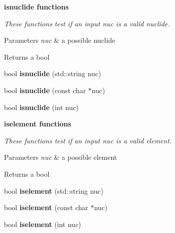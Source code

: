 \begin{Indent}{\bf isnuclide functions}\par
{\em These functions test if an input {\itshape nuc} is a valid nuclide. 
\begin{DoxyParams}{Parameters}
{\em nuc} & a possible nuclide \\
\hline
\end{DoxyParams}
\begin{DoxyReturn}{Returns}
a bool 
\end{DoxyReturn}
}\begin{DoxyCompactItemize}
\item 
bool {\bfseries isnuclide} (std\+::string nuc)\hypertarget{namespacepyne_1_1nucname_a98523777b3d9e835b929bb9e49986312}{}\label{namespacepyne_1_1nucname_a98523777b3d9e835b929bb9e49986312}

\item 
bool {\bfseries isnuclide} (const char $\ast$nuc)\hypertarget{namespacepyne_1_1nucname_af462f395c08b88dadcf4b2f0d0e6a090}{}\label{namespacepyne_1_1nucname_af462f395c08b88dadcf4b2f0d0e6a090}

\item 
bool {\bfseries isnuclide} (int nuc)\hypertarget{namespacepyne_1_1nucname_a78423ab514ba698a3e86d808423f364b}{}\label{namespacepyne_1_1nucname_a78423ab514ba698a3e86d808423f364b}

\end{DoxyCompactItemize}
\end{Indent}
\begin{Indent}{\bf iselement functions}\par
{\em These functions test if an input {\itshape nuc} is a valid element. 
\begin{DoxyParams}{Parameters}
{\em nuc} & a possible element \\
\hline
\end{DoxyParams}
\begin{DoxyReturn}{Returns}
a bool 
\end{DoxyReturn}
}\begin{DoxyCompactItemize}
\item 
bool {\bfseries iselement} (std\+::string nuc)\hypertarget{namespacepyne_1_1nucname_a9e11edcac3e156039532a2806436dc27}{}\label{namespacepyne_1_1nucname_a9e11edcac3e156039532a2806436dc27}

\item 
bool {\bfseries iselement} (const char $\ast$nuc)\hypertarget{namespacepyne_1_1nucname_a64f8ead8b5d31a7119039511f3a164c7}{}\label{namespacepyne_1_1nucname_a64f8ead8b5d31a7119039511f3a164c7}

\item 
bool {\bfseries iselement} (int nuc)\hypertarget{namespacepyne_1_1nucname_a2905de5d4024d9f5d287026d2e8e74f3}{}\label{namespacepyne_1_1nucname_a2905de5d4024d9f5d287026d2e8e74f3}

\end{DoxyCompactItemize}
\end{Indent}
